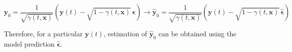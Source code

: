 \begin{equation*}
\mathbf{y}_{0} = \frac{1}{\sqrt{\gamma(t, \mathbf{x})}} \left( \mathbf{y}(t) - \sqrt{1-\gamma(t, \mathbf{x})} \, \boldsymbol{\epsilon} \right)\rightarrow \hat{\mathbf{y}}_{0} = \frac{1}{\sqrt{\gamma(t, \mathbf{x})}} \left( \mathbf{y}(t) - \sqrt{1-\gamma(t, \mathbf{x})} \, \hat{\boldsymbol{\epsilon}} \right)
\end{equation*}

Therefore, for a particular $\mathbf{y}(t) $, estimation of $\hat{\mathbf{y}}_{0}$ can be obtained using the model prediction $\hat{\boldsymbol{\epsilon}}$. 






